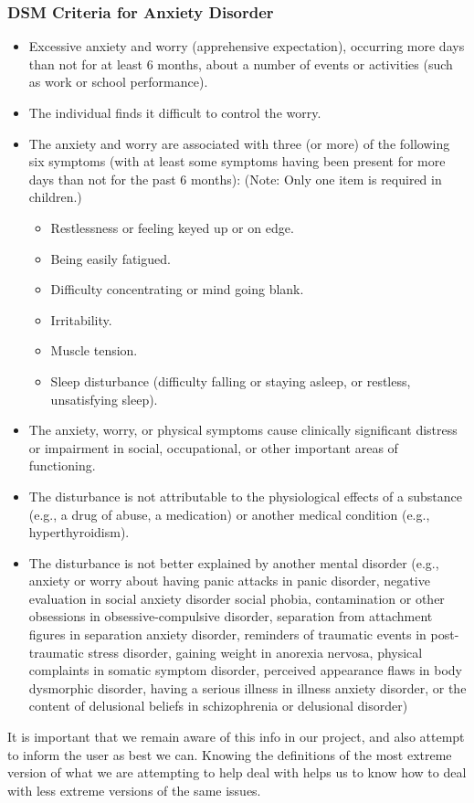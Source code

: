 \documentclass[a4paper,10pt]{article}
\begin{document}
\subsubsection{DSM Criteria for Anxiety Disorder}
\begin{itemize}
	\item Excessive anxiety and worry (apprehensive expectation), occurring more days than not for at least 6 months, about a number of events or activities (such as work or school performance).
	\item The individual finds it difficult to control the worry.
	\item The anxiety and worry are associated with three (or more) of the following six symptoms (with at least some symptoms having been present for more days than not for the past 6 months):
	(Note: Only one item is required in children.)
	\begin{itemize}
		\item Restlessness or feeling keyed up or on edge.
		\item Being easily fatigued.
		\item Difficulty concentrating or mind going blank.
		\item Irritability.
		\item Muscle tension.
		\item Sleep disturbance (difficulty falling or staying asleep, or restless, unsatisfying sleep).
	\end{itemize}
	
	\item The anxiety, worry, or physical symptoms cause clinically significant distress or impairment in social, occupational, or other important areas of functioning.
	\item The disturbance is not attributable to the physiological effects of a substance (e.g., a drug of abuse, a medication) or another medical condition (e.g., hyperthyroidism).
	\item The disturbance is not better explained by another mental disorder (e.g., anxiety or worry about having panic attacks in panic disorder, negative evaluation in social anxiety
	disorder social phobia, contamination or other obsessions in obsessive-compulsive disorder, separation from attachment figures in separation anxiety disorder, reminders of traumatic
	events in post-traumatic stress disorder, gaining weight in anorexia nervosa, physical complaints in somatic symptom disorder, perceived appearance flaws in body dysmorphic disorder,
	having a serious illness in illness anxiety disorder, or the content of delusional beliefs in schizophrenia or delusional disorder)\cite{dsmAnxiety}
\end{itemize}
It is important that we remain aware of this info in our project, and also attempt to inform the user as best we can.  Knowing the definitions of the most extreme version of what we are
attempting to help deal with helps us to know how to deal with less extreme versions of the same issues.
\par
\end{document}
